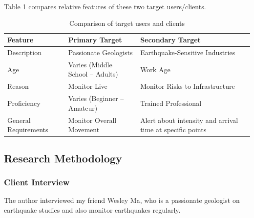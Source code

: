 \documentclass{article}
\begin{document}
Table \ref{table:users} compares relative features of these two target users/clients.

\begin{table}[!ht]
    \centering

    \begin{tabular}{|p{55pt}||p{145pt}|p{145pt}|}
        \hline
        Feature              & Primary Target                       & Secondary Target                                          \\
        \hline\hline
        Description          & Passionate Geologists                & Earthquake-Sensitive Industries                           \\
        \hline
        Age                  & Varies (Middle School -- Adults)     & Work Age                                                  \\
        \hline
        Reason               & Monitor Live \and Latest Earthquakes & Monitor Risks to Infrastructure                           \\
        \hline
        Proficiency          & Varies (Beginner -- Amateur)         & Trained Professional                                      \\
        \hline
        General Requirements & Monitor Overall Movement             & Alert about intensity and arrival time at specific points \\
        \hline
    \end{tabular}

    \caption{Comparison of target users and clients}
    \label{table:users}
\end{table}

\subsection{Research Methodology}
\subsubsection{Client Interview}
The author interviewed my friend Wesley Ma, who is a passionate geologist on earthquake studies and also monitor earthquakes regularly.
\end{document}
